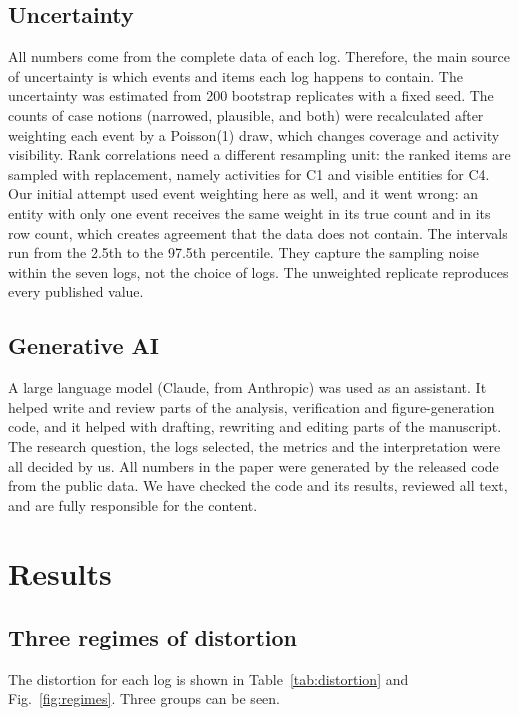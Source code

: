 \documentclass[pdflatex,sn-mathphys-num]{sn-jnl}
\begin{document}
\subsection{Uncertainty}\label{sec:uncertainty}

All numbers come from the complete data of each log. Therefore, the main source of uncertainty is which events and items each log happens to contain. The uncertainty was estimated from 200 bootstrap replicates with a fixed seed. The counts of case notions (narrowed, plausible, and both) were recalculated after weighting each event by a Poisson(1) draw, which changes coverage and activity visibility. Rank correlations need a different resampling unit: the ranked items are sampled with replacement, namely activities for C1 and visible entities for C4. Our initial attempt used event weighting here as well, and it went wrong: an entity with only one event receives the same weight in its true count and in its row count, which creates agreement that the data does not contain. The intervals run from the 2.5th to the 97.5th percentile. They capture the sampling noise within the seven logs, not the choice of logs. The unweighted replicate reproduces every published value.

\subsection{Generative AI}\label{sec:ai}

A large language model (Claude, from Anthropic) was used as an assistant. It helped write and review parts of the analysis, verification and figure-generation code, and it helped with drafting, rewriting and editing parts of the manuscript. The research question, the logs selected, the metrics and the interpretation were all decided by us. All numbers in the paper were generated by the released code from the public data. We have checked the code and its results, reviewed all text, and are fully responsible for the content.

\section{Results}\label{sec:results}

\subsection{Three regimes of distortion}\label{sec:regimes}

The distortion for each log is shown in Table~\ref{tab:distortion} and Fig.~\ref{fig:regimes}. Three groups can be seen.
\end{document}
